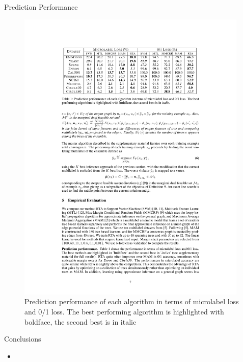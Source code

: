 \documentclass[first=dgreen,second=purple,logo=yellowexc]{aaltoslides}
\begin{document}
%
\begin{frame}{Prediction Performance}
	\begin{figure}
		\begin{center}
			\includegraphics[width=11cm]{./result_table.pdf}
			\caption{Prediction performance of each algorithm in terms of microlabel loss and 0/1 loss. The best performing algorithm is highlighted with boldface, the second best is in italic}
		\end{center}
	\end{figure}
\end{frame}



%
\begin{frame}{Conclusions}
	\begin{itemize}
		\item 
	\end{itemize}
\end{frame}

\end{document}
